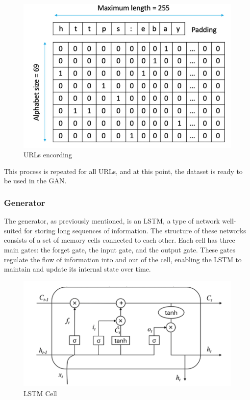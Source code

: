 \begin{figure}[htp]
    \centering
    \includegraphics[width=0.8\linewidth]{images/URLs_preprocessing.png}
    \caption{URLs encording}
    \label{fig:URLs encording}
\end{figure}

This process is repeated for all URLs, and at this point, the dataset is ready to be used in the GAN.

\subsubsection{Generator}
The generator, as previously mentioned, is an LSTM, a type of network well-suited for storing long sequences of information. The structure of these networks consists of a set of memory cells connected to each other. Each cell has three main gates: the forget gate, the input gate, and the output gate. These gates regulate the flow of information into and out of the cell, enabling the LSTM to maintain and update its internal state over time.

\begin{figure}[htp]
    \centering
    \includegraphics[width=0.8\linewidth]{images/generator_structure1.png}
    \caption{LSTM Cell}
    \label{fig:LSTM Cell}
\end{figure}

